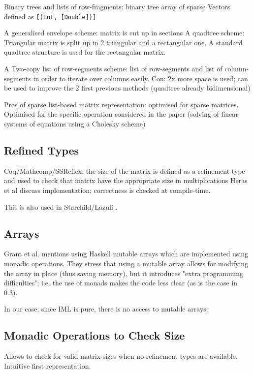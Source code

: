 \documentclass[runningheads]{llncs}
\begin{document}
Binary trees and lists of row-fragments: binary tree array of sparse Vectors defined as \lstinline{[(Int, [Double])]}

A generalised envelope scheme: matrix is cut up in sections
A quadtree scheme: Triangular matrix is split up in 2 triangular and a rectangular one. 
A standard quadtree structure is used for the rectangular matrix.

A Two-copy list of row-segments scheme: list of row-segments and list of column-segments in order to iterate over columns easily. Con: 2x more space is used; can be used to improve the 2 first previous methods (quadtree already bidimensional)

Pros of sparse list-based matrix representation: optimised for sparse matrices. Optimised for the specific operation considered in the paper (solving of linear systems of equations using a Cholesky scheme)



\subsection{Refined Types}
%
Coq/Mathcomp/SSReflex: the size of the matrix is defined as a refinement type and used to check that matrix have the appropriate size in multiplications
Heras et al \cite{heras_incidence_2011} discuss implementation; correctness is checked at compile-time.

This is also used in Starchild/Lazuli \cite{kokke_neural_2020}.


\subsection{Arrays}
Grant et al. \cite{grant_sparse_1996} mentions using Haskell mutable arrays which are implemented using monadic operations. They stress that using a mutable array allows for modifying the array in place (thus saving memory), but it introduces "extra programming difficulties"; i.e. the use of monads makes the code less clear (as is the case in \ref{subs:monads}). 

In our case, since IML is pure, there is no access to mutable arrays.

\subsection{Monadic Operations to Check Size} \label{subs:monads}
Allows to check for valid matrix sizes when no refinement types are available. Intuitive first representation.
\end{document}
